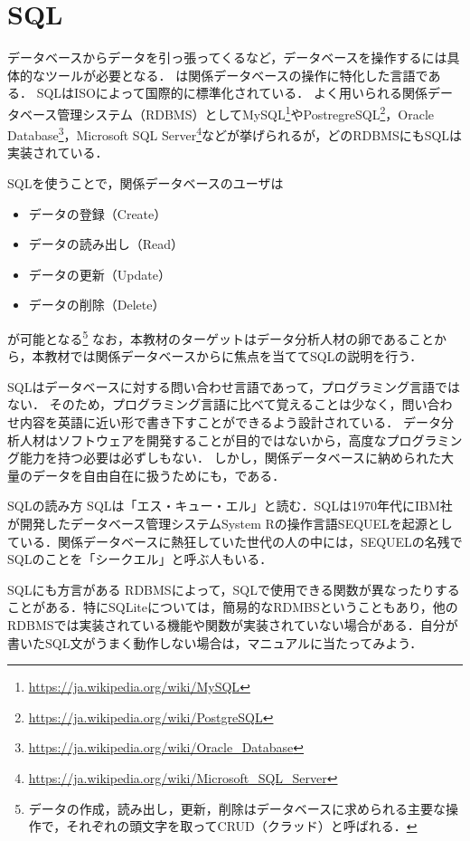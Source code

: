 \chapter{SQL}
データベースからデータを引っ張ってくるなど，データベースを操作するには具体的なツールが必要となる．
 は関係データベースの操作に特化した言語である．
SQLはISOによって国際的に標準化されている．
よく用いられる関係データベース管理システム（RDBMS）としてMySQL\footnote{\url{https://ja.wikipedia.org/wiki/MySQL}}やPostregreSQL\footnote{\url{https://ja.wikipedia.org/wiki/PostgreSQL}}，Oracle Database\footnote{\url{https://ja.wikipedia.org/wiki/Oracle_Database}}，Microsoft SQL Server\footnote{\url{https://ja.wikipedia.org/wiki/Microsoft\_SQL\_Server}}などが挙げられるが，どのRDBMSにもSQLは実装されている．

SQLを使うことで，関係データベースのユーザは
\begin{itemize}
\item データの登録（Create）
\item データの読み出し（Read）
\item データの更新（Update）
\item データの削除（Delete）
\end{itemize}

が可能となる\footnote{データの作成，読み出し，更新，削除はデータベースに求められる主要な操作で，それぞれの頭文字を取ってCRUD（クラッド）と呼ばれる．}
なお，本教材のターゲットはデータ分析人材の卵であることから，本教材では関係データベースからに焦点を当ててSQLの説明を行う．

SQLはデータベースに対する問い合わせ言語であって，プログラミング言語ではない．
そのため，プログラミング言語に比べて覚えることは少なく，問い合わせ内容を英語に近い形で書き下すことができるよう設計されている．
データ分析人材はソフトウェアを開発することが目的ではないから，高度なプログラミング能力を持つ必要は必ずしもない．
しかし，関係データベースに納められた大量のデータを自由自在に扱うためにも，である．


\begin{notebox}{SQLの読み方}
SQLは「エス・キュー・エル」と読む．SQLは1970年代にIBM社が開発したデータベース管理システムSystem Rの操作言語SEQUELを起源としている．関係データベースに熱狂していた世代の人の中には，SEQUELの名残でSQLのことを「シークエル」と呼ぶ人もいる．
\end{notebox}

\begin{warningbox}{SQLにも方言がある}
RDBMSによって，SQLで使用できる関数が異なったりすることがある．特にSQLiteについては，簡易的なRDMBSということもあり，他のRDBMSでは実装されている機能や関数が実装されていない場合がある．自分が書いたSQL文がうまく動作しない場合は，マニュアルに当たってみよう．
\end{warningbox}


